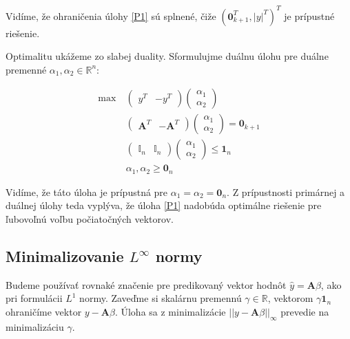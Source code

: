 \documentclass[report.tex]{subfiles}
\begin{document}
\newpage

Vidíme, že ohraničenia úlohy \eqref{P1} sú splnené, čiže $\left(\mathbf{0}_{k+1}^T, |y|^T \right)^T$ je prípustné riešenie.

Optimalitu ukážeme zo slabej duality. Sformulujme duálnu úlohu pre duálne premenné $\alpha_1, \alpha_2 \in \mathbb{R}^{n}$:

\begin{align*}
	\text{max}~ &
	\left(
		\begin{array}{c|c}
			y^T & -y^T
		\end{array}
	\right)
	\left(
		\begin{array}{c}
			\alpha_1 \\
			\hline
			\alpha_2
		\end{array}
	\right) \\
	&\left(
		\begin{array}{c|c}
			\mathbf{A}^T & -\mathbf{A}^T
		\end{array}
	\right)
	\left(
		\begin{array}{c}
			\alpha_1 \\
			\hline
			\alpha_2
		\end{array}
	\right)
	=
	\mathbf{0}_{k+1} \\
	&\left(
		\begin{array}{c|c}
			\mathbb{I}_n & \mathbb{I}_n
		\end{array}
	\right)
	\left(
		\begin{array}{c}
			\alpha_1 \\
			\hline
			\alpha_2
		\end{array}
	\right)
	\leq
	\mathbf{1}_{n} \\
	&\alpha_1, \alpha_2 \geq \mathbf{0}_{n} 
\end{align*}

Vidíme, že táto úloha je prípustná pre $\alpha_1 = \alpha_2 = \mathbf{0}_n$. Z prípustnosti primárnej a duálnej úlohy teda vyplýva, že úloha \eqref{P1} nadobúda optimálne riešenie pre ľubovoľnú voľbu počiatočných vektorov.

\subsection{Minimalizovanie $L^{\infty}$ normy}

Budeme používať rovnaké značenie pre predikovaný vektor hodnôt $\hat{y} = \mathbf{A}\beta$, ako pri formulácii $L^1$ normy. Zaveďme si skalárnu premennú $\gamma \in \mathbb{R}$, vektorom $\gamma\mathbf{1}_n$ ohraničíme vektor $y - \mathbf{A} \beta$. Úloha sa z minimalizácie $||y - \mathbf{A} \beta||_{\infty}$ prevedie na minimalizáciu $\gamma$.
\end{document}
